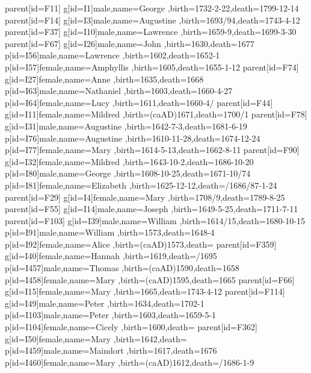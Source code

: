 parent[id=F11]{
	g[id=I1]{male,name={George },birth={1732-2-22}{},death={1799-12-14}{}}
	parent[id=F14]{
		g[id=I3]{male,name={Augustine },birth={1693/94}{},death={1743-4-12}{}}
		parent[id=F37]{
			g[id=I10]{male,name={Lawrence },birth={1659-9}{},death={1699-3-30}{}}
			parent[id=F67]{
				g[id=I26]{male,name={John },birth={1630}{},death={1677}{}}
				p[id=I56]{male,name={Lawrence },birth={1602}{},death={1652-1}{}}
				p[id=I57]{female,name={Amphyllis },birth={1605}{},death={1655-1-12}{}}
			}
			parent[id=F74]{
				g[id=I27]{female,name={Anne },birth={1635}{},death={1668}{}}
				p[id=I63]{male,name={Nathaniel },birth={1603}{},death={1660-4-27}{}}
				p[id=I64]{female,name={Lucy \surn{}},birth={1611}{},death={1660-4/}{}}
			}
		}
		parent[id=F44]{
			g[id=I11]{female,name={Mildred },birth={(caAD)1671}{},death={1700/1}{}}
			parent[id=F78]{
				g[id=I31]{male,name={Augustine },birth={1642-7-3}{},death={1681-6-19}{}}
				p[id=I76]{male,name={Augustine },birth={1610-11-28}{},death={1674-12-24}{}}
				p[id=I77]{female,name={Mary },birth={1614-5-13}{},death={1662-8-11}{}}
			}
			parent[id=F90]{
				g[id=I32]{female,name={Mildred },birth={1643-10-2}{},death={1686-10-20}{}}
				p[id=I80]{male,name={George },birth={1608-10-25}{},death={1671-10/74}{}}
				p[id=I81]{female,name={Elizabeth },birth={1625-12-12}{},death={/1686/87-1-24}{}}
			}
		}
	}
	parent[id=F29]{
		g[id=I4]{female,name={Mary },birth={1708/9}{},death={1789-8-25}{}}
		parent[id=F55]{
			g[id=I14]{male,name={Joseph },birth={1649-5-25}{},death={1711-7-11}{}}
			parent[id=F103]{
				g[id=I39]{male,name={William },birth={1614/15}{},death={1680-10-15}{}}
				p[id=I91]{male,name={William },birth={1573}{},death={1648-4}{}}
				p[id=I92]{female,name={Alice },birth={(caAD)1573}{},death={}{}}
			}
			parent[id=F359]{
				g[id=I40]{female,name={Hannah },birth={1619}{},death={/1695}{}}
				p[id=I457]{male,name={Thomas },birth={(caAD)1590}{},death={1658}{}}
				p[id=I458]{female,name={Mary },birth={(caAD)1595}{},death={1665}{}}
			}
		}
		parent[id=F66]{
			g[id=I15]{female,name={Mary },birth={1665}{},death={1743-4-12}{}}
			parent[id=F114]{
				g[id=I49]{male,name={Peter },birth={1634}{},death={1702-1}{}}
				p[id=I103]{male,name={Peter },birth={1603}{},death={1659-5-1}{}}
				p[id=I104]{female,name={Cicely },birth={1600}{},death={}{}}
			}
			parent[id=F362]{
				g[id=I50]{female,name={Mary },birth={1642}{},death={}{}}
				p[id=I459]{male,name={Maindort },birth={1617}{},death={1676}{}}
				p[id=I460]{female,name={Mary },birth={(caAD)1612}{},death={/1686-1-9}{}}
			}
		}
	}
}
